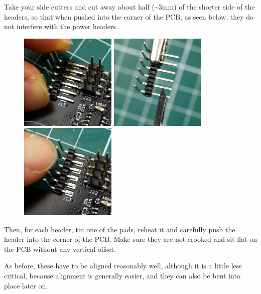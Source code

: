 \documentclass[12pt, a4paper]{article}
\begin{document}
Take your side cutters and cut away about half (\textasciitilde3mm) of the shorter side of the
headers, so that when pushed into the corner of the PCB, as seen below, they do not interfere
with the power headers.

\begin{figure}[H]
    \centering
    \includegraphics[width=46mm]{images/section_2-2_testfit.jpg}
    \hspace{2mm}
    \includegraphics[width=46mm]{images/section_2-2_cutting.jpg}
    \hspace{2mm}
    \includegraphics[width=46mm]{images/section_2-2_aligning.jpg}
\end{figure}

Then, for each header, tin one of the pads, reheat it and carefully push the header into the 
corner of the PCB. Make sure they are not crooked and sit flat on the PCB without any vertical
offset.

As before, these have to be aligned reasonably well, although it is a little less critical,
because alignment is generally easier, and they can also be bent into place later on.
\end{document}
